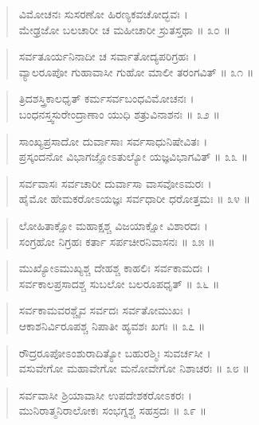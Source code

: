 \begin{verse}
ವಿಮೋಚನಃ ಸುಸರಣೋ ಹಿರಣ್ಯಕವಚೋದ್ಭವಃ ।\\ಮೇಢ್ರಜೋ ಬಲಚಾರೀ ಚ ಮಹೀಚಾರೀ ಸ್ರುತಸ್ತಥಾ \num{॥ ೩೦ ॥}
\end{verse}

\begin{verse}
ಸರ್ವತೂರ್ಯನಿನಾದೀ ಚ ಸರ್ವಾತೋದ್ಯಪರಿಗ್ರಹಃ ।\\ವ್ಯಾಲರೂಪೋ ಗುಹಾವಾಸೀ ಗುಹೋ ಮಾಲೀ ತರಂಗವಿತ್ \num{॥ ೩೧ ॥}
\end{verse}

\begin{verse}
ತ್ರಿದಶಸ್ತ್ರಿಕಾಲಧೃತ್ ಕರ್ಮಸರ್ವಬಂಧವಿಮೋಚನಃ ।\\ಬಂಧನಸ್ತ್ವಸುರೇಂದ್ರಾಣಾಂ ಯುಧಿ ಶತ್ರುವಿನಾಶನಃ \num{॥ ೩೨ ॥}
\end{verse}

\begin{verse}
ಸಾಂಖ್ಯಪ್ರಸಾದೋ ದುರ್ವಾಸಾಃ ಸರ್ವಸಾಧುನಿಷೇವಿತಃ ।\\ಪ್ರಸ್ಕಂದನೋ ವಿಭಾಗಜ್ಞೋಽತುಲ್ಯೋ ಯಜ್ಞವಿಭಾಗವಿತ್ \num{॥ ೩೩ ॥}
\end{verse}

\begin{verse}
ಸರ್ವವಾಸಃ ಸರ್ವಚಾರೀ ದುರ್ವಾಸಾ ವಾಸವೋಽಮರಃ ।\\ಹೈಮೋ ಹೇಮಕರೋಽಯಜ್ಞಃ ಸರ್ವಧಾರೀ ಧರೋತ್ತಮಃ \num{॥ ೩೪ ॥}
\end{verse}

\begin{verse}
ಲೋಹಿತಾಕ್ಷೋ ಮಹಾಕ್ಷಶ್ಚ ವಿಜಯಾಕ್ಷೋ ವಿಶಾರದಃ ।\\ಸಂಗ್ರಹೋ ನಿಗ್ರಹಃ ಕರ್ತಾ ಸರ್ಪಚೀರನಿವಾಸನಃ \num{॥ ೩೫ ॥}
\end{verse}

\begin{verse}
ಮುಖ್ಯೋಽಮುಖ್ಯಶ್ಚ ದೇಹಶ್ಚ ಕಾಹಲಿಃ ಸರ್ವಕಾಮದಃ ।\\ಸರ್ವಕಾಲಪ್ರಸಾದಶ್ಚ ಸುಬಲೋ ಬಲರೂಪಧೃತ್ \num{॥ ೩೬ ॥}
\end{verse}

\begin{verse}
ಸರ್ವಕಾಮವರಶ್ಚೈವ ಸರ್ವದಃ ಸರ್ವತೋಮುಖಃ ।\\ಆಕಾಶನಿರ್ವಿರೂಪಶ್ಚ ನಿಪಾತೀ ಹ್ಯವಶಃ ಖಗಃ \num{॥ ೩೭ ॥}
\end{verse}

\begin{verse}
ರೌದ್ರರೂಪೋಽಂಶುರಾದಿತ್ಯೋ ಬಹುರಶ್ಮಿಃ ಸುವರ್ಚಸೀ ।\\ವಸುವೇಗೋ ಮಹಾವೇಗೋ ಮನೋವೇಗೋ ನಿಶಾಚರಃ \num{॥ ೩೮ ॥}
\end{verse}

\begin{verse}
ಸರ್ವವಾಸೀ ಶ್ರಿಯಾವಾಸೀ ಉಪದೇಶಕರೋಽಕರಃ ।\\ಮುನಿರಾತ್ಮನಿರಾಲೋಕಃ ಸಂಭಗ್ನಶ್ಚ ಸಹಸ್ರದಃ \num{॥ ೩೯ ॥}
\end{verse}

